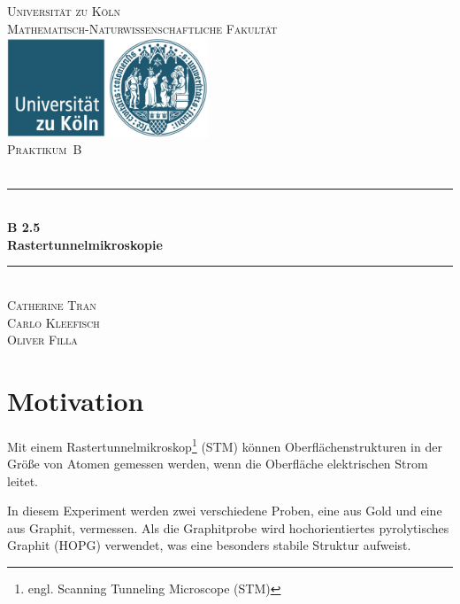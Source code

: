 \documentclass[12pt,a4paper]{scrartcl}
\numberwithin{equation}{section} %
\newcommand{\HRule}{\rule{\linewidth}{0.7mm}}
\begin{document}
\begin{titlepage}
	\pagestyle{empty}

	\begin{center}

	\textsc{\LARGE Universität zu Köln }\\ [0.4cm]
	\textsc{Mathematisch-Naturwissenschaftliche Fakultät} \\[1.5cm]

	\includegraphics[width=0.45\textwidth]{../media/uni.jpg}\\[1.5cm]  %

	\textsc{\Large Praktikum~B}\\[2mm]
	\textsc{}\\[10mm]
	\HRule \\[0.4cm]

		{	\Huge \bfseries B 2.5}\\[0.4cm]
			{	\huge \bfseries Rastertunnelmikroskopie}\\[0.3cm]
	
	\HRule \\[3cm]

		\textsc{\Large Catherine Tran } \\[3pt]
		\textsc{\Large Carlo Kleefisch } \\[3pt]
		\textsc{\Large Oliver Filla } \\[3pt]
		
	\end{center}
\end{titlepage}

\newpage
\tableofcontents
\newpage

\hypertarget{motivation}{%
\section{Motivation}\label{motivation}}

Mit einem Rastertunnelmikroskop\footnote{engl. Scanning Tunneling  Microscope (STM)} (STM) können Oberflächenstrukturen in der Größe von Atomen gemessen werden, wenn die Oberfläche elektrischen Strom leitet.

In diesem Experiment werden zwei verschiedene Proben, eine aus Gold und eine aus Graphit, vermessen. Als die Graphitprobe wird hochorientiertes pyrolytisches Graphit (HOPG) verwendet, was eine besonders stabile Struktur aufweist.
\end{document}
